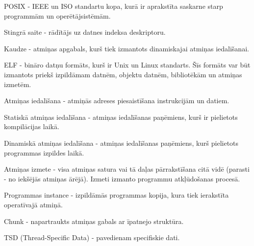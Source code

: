 \noindent 

POSIX - IEEE un ISO standartu kopa, kurā ir aprakstīta saskarne starp programmām un operētājsistēmām.

Stingrā saite - rādītājs uz datnes indeksa deskriptoru. 

Kaudze - atmiņas apgabals,  kurš tiek izmantots dinamiskajai atmiņas iedalīšanai.

ELF -  bināro datņu formāts, kurš ir Unix un Linux standarts. Šīs formāts var būt izmantots priekš izpildāmam datnēm, objektu datnēm, bibliotēkām un atmiņas izmetēm.

Atmiņas iedalīšana - atmiņās adreses piesaistīšana instrukcijām un datiem.

Statiskā atmiņas iedalīšana -  atmiņas iedalīšanas paņēmiens, kurš ir pielietots kompilācijas laikā.

Dinamiskā atmiņas iedalīšana - atmiņas iedalīšanas paņēmiens, kurš pielietots programmas izpildes laikā. 

Atmiņas izmete - visa atmiņas satura vai tā daļas pārrakstīšana citā vidē (parasti - no iekšējās atmiņas ārējā). 
Izmeti izmanto programmu atkļūdošanas procesā.

Programmas instance - izpildāmās programmas kopija, kura tiek ierakstīta operatīvajā atmiņā.

Chunk - napartraukts atmiņas gabals ar īpatnejo struktūra.

TSD (Thread-Specific Data) - pavedienam specifiskie dati.
